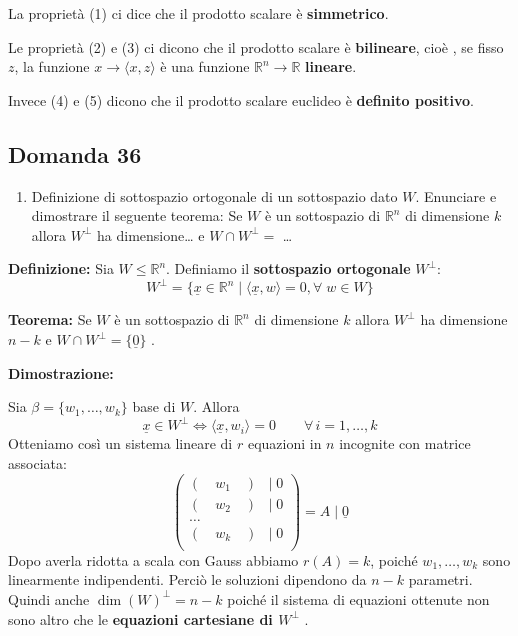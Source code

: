 \documentclass[
  a4paper,
]{article}
\providecommand{\tightlist}{%
  \setlength{\itemsep}{0pt}\setlength{\parskip}{0pt}}
\providecommand{\tightlist}{}
\begin{document}
La proprietà (1) ci dice che il prodotto scalare è \textbf{simmetrico}.

Le proprietà (2) e (3) ci dicono che il prodotto scalare è
\textbf{bilineare}, cioè , se fisso \(z\), la funzione
\(x \to \langle x, z \rangle\) è una funzione
\(\mathbb{R}^n \to \mathbb{R}\) \textbf{lineare}.

Invece (4) e (5) dicono che il prodotto scalare euclideo è
\textbf{definito positivo}.

\hypertarget{domanda-36}{%
\subsection{Domanda 36}\label{domanda-36}}

\begin{observationbox}[Domanda]
\begin{enumerate}
\def\labelenumi{\arabic{enumi}.}
\setcounter{enumi}{35}
\tightlist
\item
  Definizione di sottospazio ortogonale di un sottospazio dato \(W\).
  Enunciare e dimostrare il seguente teorema: Se \(W\) è un sottospazio
  di \(\mathbb{R}^n\) di dimensione \(k\) allora \(W^\perp\) ha
  dimensione\ldots{} e \(W \cap W^{\perp} =\) \ldots{}
\end{enumerate}
\end{observationbox}

\textbf{Definizione:} Sia \(W \leq \mathbb{R}^n\). Definiamo il
\textbf{sottospazio ortogonale} \(W^{\perp}\): \[
W^{\perp} = \{ \underline{x} \in \mathbb{R}^n \mid \langle \underline{x}, w \rangle = 0, \forall \;w \in W\}
\]

\textbf{Teorema:} Se \(W\) è un sottospazio di \(\mathbb{R}^n\) di
dimensione \(k\) allora \(W^\perp\) ha dimensione \(n-k\) e
\(W \cap W^{\perp} = \{\underline{0}\}\) .

\textbf{Dimostrazione:}

Sia \(\beta = \{w_1, \dots, w_k\}\) base di \(W\). Allora \[
\underline{x} \in W^{\perp} \iff \langle \underline{x}, w_i \rangle = 0 \qquad\forall\, i = 1, \dots, k
\] Otteniamo così un sistema lineare di \(r\) equazioni in \(n\)
incognite con matrice associata: \[
\begin{pmatrix}  
(\quad w_1\quad ) &|\; 0 \\  
(\quad w_2\quad ) & |\;0 \\
\dots \\
(\quad w_k\quad ) &|\;0 \\
\end{pmatrix}  
= A \mid \underline{0}
\] Dopo averla ridotta a scala con Gauss abbiamo \(r(A) = k\), poiché
\(w_1, \dots, w_k\) sono linearmente indipendenti. Perciò le soluzioni
dipendono da \(n-k\) parametri. Quindi anche \(\dim(W)^{\perp} = n-k\)
poiché il sistema di equazioni ottenute non sono altro che le
\textbf{equazioni cartesiane di \(W^{\perp}\)} .
\end{document}
